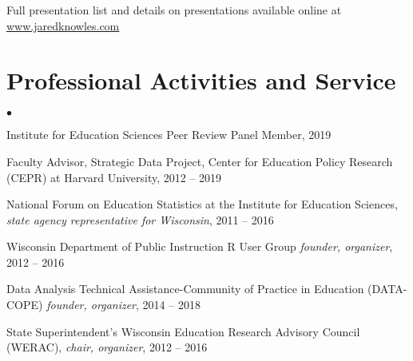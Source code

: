 \documentclass[margin,line]{res}
\newenvironment{list2}{
  \begin{list}{$\bullet$}{%
      \setlength{\itemsep}{0in}
      \setlength{\parsep}{0in} \setlength{\parskip}{0in}
      \setlength{\topsep}{0in} \setlength{\partopsep}{0in} 
      \setlength{\leftmargin}{0.2in}}}{\end{list}}
\begin{document}
\begin{resume}

% 



% 

Full presentation list and details on presentations available online at 
\url{www.jaredknowles.com}

% 
\section{\sc Professional Activities and Service}
% 
\begin{list2}
\item Institute for Education Sciences Peer Review Panel Member, 2019
\item Faculty Advisor, Strategic Data Project, Center for Education Policy Research (CEPR) at Harvard University, 2012 -- 2019
\item National Forum on Education Statistics at the Institute for Education Sciences, \emph{state agency representative for Wisconsin}, 2011 -- 2016
\item Wisconsin Department of Public Instruction R User Group \emph{founder, organizer}, 
2012 -- 2016 
\item Data Analysis Technical Assistance-Community of Practice in Education 
(DATA-COPE) \emph{founder, organizer}, 2014 -- 2018
\item State Superintendent's Wisconsin Education Research Advisory Council (WERAC), 
\emph{chair, organizer}, 2012 -- 2016
\end{list2}


\end{resume}
\end{document}
